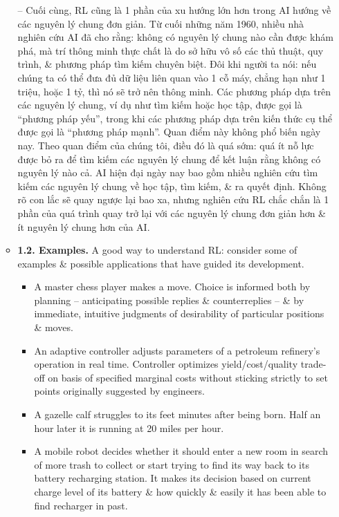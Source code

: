 \documentclass{article}
\begin{document}
\begin{itemize}
\begin{itemize}
        -- Cuối cùng, RL cũng là 1 phần của xu hướng lớn hơn trong AI hướng về các nguyên lý chung đơn giản. Từ cuối những năm 1960, nhiều nhà nghiên cứu AI đã cho rằng: không có nguyên lý chung nào cần được khám phá, mà trí thông minh thực chất là do sở hữu vô số các thủ thuật, quy trình, \& phương pháp tìm kiếm chuyên biệt. Đôi khi người ta nói: nếu chúng ta có thể đưa đủ dữ liệu liên quan vào 1 cỗ máy, chẳng hạn như 1 triệu, hoặc 1 tỷ, thì nó sẽ trở nên thông minh. Các phương pháp dựa trên các nguyên lý chung, ví dụ như tìm kiếm hoặc học tập, được gọi là ``phương pháp yếu'', trong khi các phương pháp dựa trên kiến thức cụ thể được gọi là ``phương pháp mạnh''. Quan điểm này không phổ biến ngày nay. Theo quan điểm của chúng tôi, điều đó là quá sớm: quá ít nỗ lực được bỏ ra để tìm kiếm các nguyên lý chung để kết luận rằng không có nguyên lý nào cả. AI hiện đại ngày nay bao gồm nhiều nghiên cứu tìm kiếm các nguyên lý chung về học tập, tìm kiếm, \& ra quyết định. Không rõ con lắc sẽ quay ngược lại bao xa, nhưng nghiên cứu RL chắc chắn là 1 phần của quá trình quay trở lại với các nguyên lý chung đơn giản hơn \& ít nguyên lý chung hơn của AI.
        \item {\bf1.2. Examples.} A good way to understand RL: consider some of examples \& possible applications that have guided its development.
        \begin{itemize}
            \item A master chess player makes a move. Choice is informed both by planning -- anticipating possible replies \& counterreplies -- \& by immediate, intuitive judgments of desirability of particular positions \& moves.
            \item An adaptive controller adjusts parameters of a petroleum refinery's operation in real time. Controller optimizes yield/cost/quality trade-off on basis of specified marginal costs without sticking strictly to set points originally suggested by engineers.
            \item A gazelle calf struggles to its feet minutes after being born. Half an hour later it is running at 20 miles per hour.
            \item A mobile robot decides whether it should enter a new room in search of more trash to collect or start trying to find its way back to its battery recharging station. It makes its decision based on current charge level of its battery \& how quickly \& easily it has been able to find recharger in past.

\end{itemize}
\end{itemize}
\end{itemize}
\end{document}
